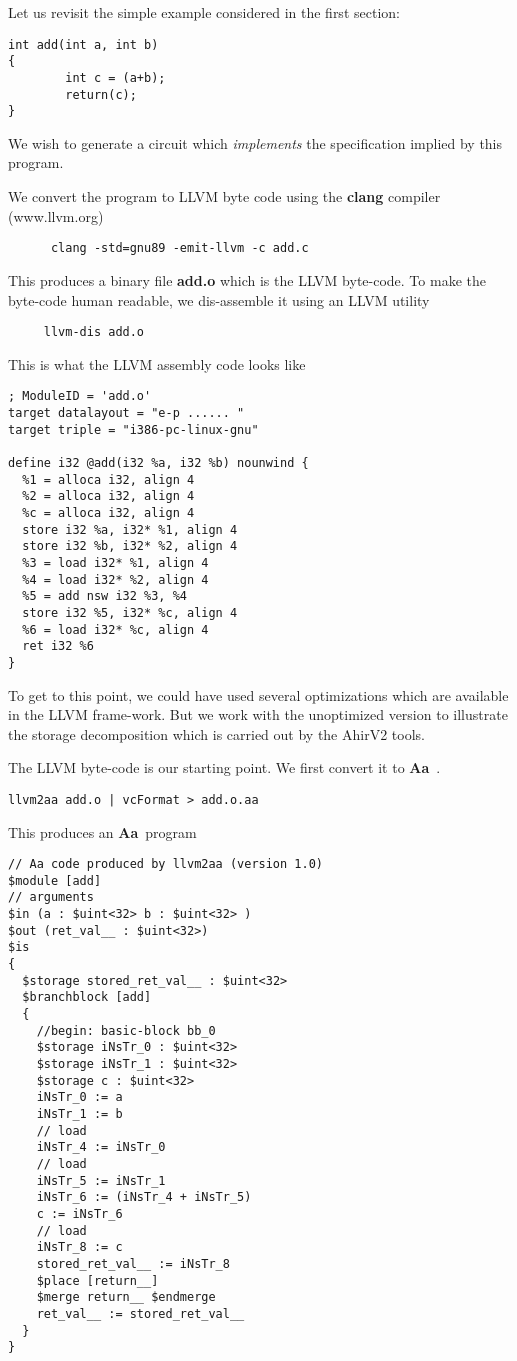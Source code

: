 \documentclass{article}
\newcommand{\Aa}{{\bf Aa}~}
\begin{document}
Let us revisit the simple example considered in
the first section:
\begin{verbatim}
int add(int a, int b)
{
        int c = (a+b);
        return(c);
}
\end{verbatim}
We wish to generate a circuit which {\em implements}
the specification implied by this program.

We convert the program to LLVM byte code using
the {\bf clang} compiler (www.llvm.org)
\begin{verbatim}
      clang -std=gnu89 -emit-llvm -c add.c
\end{verbatim}
This produces a binary file {\bf add.o} which is
the LLVM byte-code.  To make the byte-code human
readable, we dis-assemble it using an LLVM utility
\begin{verbatim}
     llvm-dis add.o
\end{verbatim}
This is what the LLVM assembly code looks like
\begin{verbatim}
; ModuleID = 'add.o'
target datalayout = "e-p ...... "
target triple = "i386-pc-linux-gnu"

define i32 @add(i32 %a, i32 %b) nounwind {
  %1 = alloca i32, align 4
  %2 = alloca i32, align 4
  %c = alloca i32, align 4
  store i32 %a, i32* %1, align 4
  store i32 %b, i32* %2, align 4
  %3 = load i32* %1, align 4
  %4 = load i32* %2, align 4
  %5 = add nsw i32 %3, %4
  store i32 %5, i32* %c, align 4
  %6 = load i32* %c, align 4
  ret i32 %6
}
\end{verbatim}
To get to this point, we could have used several
optimizations which are available in the LLVM frame-work.
But we work with the unoptimized version to illustrate
the storage decomposition which is carried out by
the AhirV2 tools.

The LLVM byte-code is our starting point.  We first convert it
to \Aa.
\begin{verbatim}
llvm2aa add.o | vcFormat > add.o.aa
\end{verbatim}
This produces an \Aa program
\begin{verbatim}
// Aa code produced by llvm2aa (version 1.0)
$module [add]
// arguments
$in (a : $uint<32> b : $uint<32> )
$out (ret_val__ : $uint<32>)
$is
{
  $storage stored_ret_val__ : $uint<32>
  $branchblock [add]
  {
    //begin: basic-block bb_0
    $storage iNsTr_0 : $uint<32>
    $storage iNsTr_1 : $uint<32>
    $storage c : $uint<32>
    iNsTr_0 := a
    iNsTr_1 := b
    // load
    iNsTr_4 := iNsTr_0
    // load
    iNsTr_5 := iNsTr_1
    iNsTr_6 := (iNsTr_4 + iNsTr_5)
    c := iNsTr_6
    // load
    iNsTr_8 := c
    stored_ret_val__ := iNsTr_8
    $place [return__]
    $merge return__ $endmerge
    ret_val__ := stored_ret_val__
  }
}
\end{verbatim}
\end{document}
